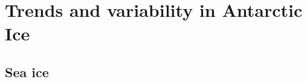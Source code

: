 \documentclass[../main.tex]{subfiles}
\begin{document}
\chapter{Trends and variability in Antarctic Ice}

\section{Sea ice}
\end{document}

